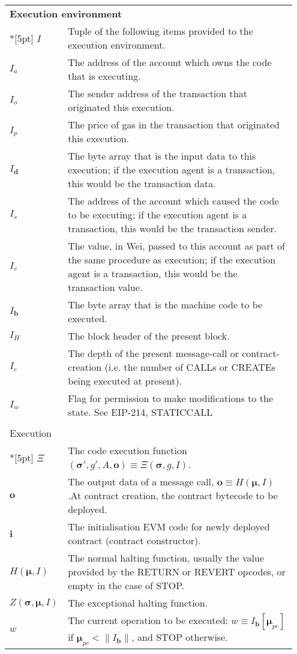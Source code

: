 \documentclass[9pt,oneside]{amsart}
\begin{document}
\begin{longtable}{p{0.10\linewidth}p{0.85\linewidth}}
\vspace{5pt} \\
\midrule
\multicolumn{2}{l}{\textbf{Execution environment}} \\*[5pt]
$I$ & Tuple of the following items provided to the execution environment. \\
$I_a$ & The address of the account which owns the code that is executing. \\
$I_o$ & The sender address of the transaction that originated this execution. \\
$I_p$ & The price of gas in the transaction that originated this execution. \\
$I_\mathbf{d}$ & The byte array that is the input data to this execution; if the execution agent is a transaction, this would be the transaction data. \\
$I_s$ & The address of the account which caused the code to be executing; if the execution agent is a transaction, this would be the transaction sender. \\
$I_v$ & The value, in Wei, passed to this account as part of the same procedure as execution; if the execution agent is a transaction, this would be the transaction value. \\
$I_\mathbf{b}$ & The byte array that is the machine code to be executed. \\
$I_H$ & The block header of the present block. \\
$I_e$ & The depth of the present message-call or contract-creation (i.e. the number of {\small CALL}s or {\small CREATE}s being executed at present). \\
$I_w$ & Flag for permission to make modifications to the state. See EIP-214, STATICCALL \\

\vspace{5pt} \\
\multicolumn{2}{l}{Execution} \\*[5pt]
$\Xi$ & The code execution function $(\boldsymbol{\sigma}', g', A, \mathbf{o}) \equiv \Xi(\boldsymbol{\sigma}, g, I)$. \\
$\mathbf{o}$ & The output data of a message call, $\mathbf{o} \equiv H(\boldsymbol{\mu}, I)$.\newline At contract creation, the contract bytecode to be deployed. \\
$\mathbf{i}$ & The initialisation EVM code for newly deployed contract (contract constructor). \\
$H(\boldsymbol{\mu}, I)$ & The normal halting function, usually the value provided by the RETURN or REVERT opcodes, or empty in the case of STOP. \\
$Z(\boldsymbol{\sigma}, \boldsymbol{\mu}, I)$ & The exceptional halting function. \\
$w$ & The current operation to be executed: $w \equiv I_\mathbf{b}[\boldsymbol{\mu}_{pc}]$ if $\boldsymbol{\mu}_{pc} < \lVert I_\mathbf{b} \rVert$, and \small{STOP} otherwise. \\


\end{longtable}
\end{document}
